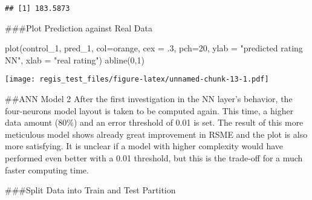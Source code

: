 \documentclass[
]{article}
\newenvironment{Shaded}{\begin{snugshade}}{\end{snugshade}}
\newcommand{\AttributeTok}[1]{\textcolor[rgb]{0.77,0.63,0.00}{#1}}
\newcommand{\DecValTok}[1]{\textcolor[rgb]{0.00,0.00,0.81}{#1}}
\newcommand{\FunctionTok}[1]{\textcolor[rgb]{0.00,0.00,0.00}{#1}}
\newcommand{\NormalTok}[1]{#1}
\newcommand{\OtherTok}[1]{\textcolor[rgb]{0.56,0.35,0.01}{#1}}
\newcommand{\SpecialCharTok}[1]{\textcolor[rgb]{0.00,0.00,0.00}{#1}}
\newcommand{\StringTok}[1]{\textcolor[rgb]{0.31,0.60,0.02}{#1}}
\begin{document}
\begin{verbatim}
## [1] 183.5873
\end{verbatim}

\#\#\#Plot Prediction against Real Data

\begin{Shaded}
\begin{Highlighting}[]
\FunctionTok{plot}\NormalTok{(control\_1, pred\_1, }\AttributeTok{col=}\StringTok{\textquotesingle{}orange\textquotesingle{}}\NormalTok{, }\AttributeTok{cex =}\NormalTok{ .}\DecValTok{3}\NormalTok{, }\AttributeTok{pch=}\DecValTok{20}\NormalTok{, }\AttributeTok{ylab =} \StringTok{"predicted rating NN"}\NormalTok{, }\AttributeTok{xlab =} \StringTok{"real rating"}\NormalTok{)}
\FunctionTok{abline}\NormalTok{(}\DecValTok{0}\NormalTok{,}\DecValTok{1}\NormalTok{)}
\end{Highlighting}
\end{Shaded}

\texttt{[image: regis\_test\_files/figure-latex/unnamed-chunk-13-1.pdf]}

\#\#ANN Model 2 After the first investigation in the NN layer's
behavior, the four-neurons model layout is taken to be computed again.
This time, a higher data amount (80\%) and an error threshold of 0.01 is
set. The result of this more meticulous model shows already great
improvement in RSME and the plot is also more satisfying. It is unclear
if a model with higher complexity would have performed even better with
a 0.01 threshold, but this is the trade-off for a much faster computing
time.

\#\#\#Split Data into Train and Test Partition

\begin{Shaded}
\end{Shaded}
\end{document}

